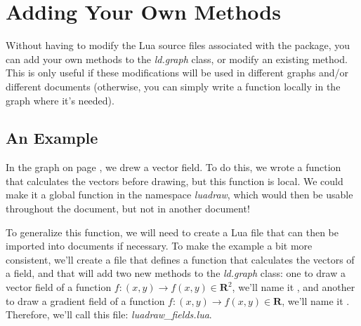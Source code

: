 \section{Adding Your Own Methods}

Without having to modify the Lua source files associated with the \luadrawenv package, you can add your own methods to the \emph{ld.graph} class, or modify an existing method. This is only useful if these modifications will be used in different graphs and/or different documents (otherwise, you can simply write a function locally in the graph where it's needed).

\subsection{An Example}
In the graph on page \pageref{field}, we drew a vector field. To do this, we wrote a function that calculates the vectors before drawing, but this function is local. We could make it a global function in the namespace \emph{luadraw}, which would then be usable throughout the document, but not in another document!

To generalize this function, we will need to create a Lua file that can then be imported into documents if necessary. To make the example a bit more consistent, we'll create a file that defines a function that calculates the vectors of a field, and that will add two new methods to the \emph{ld.graph} class: one to draw a vector field of a function $f\colon(x,y)\to f(x,y)\in \mathbf R^2$, we'll name it , and another to draw a gradient field of a function $f\colon(x,y)\to f(x,y)\in \mathbf R$, we'll name it . Therefore, we'll call this file: \emph{luadraw\_fields.lua}.

